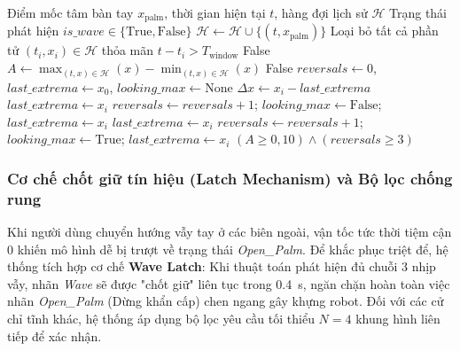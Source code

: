 \begin{algorithm}[H]
\caption{Thuật toán phát hiện cử chỉ động Wave}\label{alg:wave_detection}
\begin{algorithmic}[1]
\Require Điểm mốc tâm bàn tay $x_{\text{palm}}$, thời gian hiện tại $t$, hàng đợi lịch sử $\mathcal{H}$
\Ensure Trạng thái phát hiện $is\_wave \in \{\text{True}, \text{False}\}$
\State $\mathcal{H} \gets \mathcal{H} \cup \{(t, x_{\text{palm}})\}$
\State Loại bỏ tất cả phần tử $(t_i, x_i) \in \mathcal{H}$ thỏa mãn $t - t_i > T_{\text{window}}$
    \State \Return False
\EndIf
\State $A \gets \max_{(t, x) \in \mathcal{H}}(x) - \min_{(t, x) \in \mathcal{H}}(x)$ 
    \State \Return False 
\EndIf
\State $reversals \gets 0$, $last\_extrema \gets x_0$, $looking\_max \gets \text{None}$
    \State $\Delta x \gets x_i - last\_extrema$
         $last\_extrema \gets x_i$
         
            $reversals \gets reversals + 1$; $looking\_max \gets \text{False}$; $last\_extrema \gets x_i$
        \EndIf
    \Else
         $last\_extrema \gets x_i$
         
            $reversals \gets reversals + 1$; $looking\_max \gets \text{True}$; $last\_extrema \gets x_i$
        \EndIf
    \EndIf
\EndFor
\State \Return $(A \ge 0{,}10) \land (reversals \ge 3)$ 
\end{algorithmic}
\end{algorithm}

\subsubsection{Cơ chế chốt giữ tín hiệu (Latch Mechanism) và Bộ lọc chống rung}
Khi người dùng chuyển hướng vẫy tay ở các biên ngoài, vận tốc tức thời tiệm cận 0 khiến mô hình dễ bị trượt về trạng thái \textit{Open\_Palm}. Để khắc phục triệt để, hệ thống tích hợp cơ chế \textbf{Wave Latch}: Khi thuật toán phát hiện đủ chuỗi 3 nhịp vẫy, nhãn \textit{Wave} sẽ được "chốt giữ" liên tục trong \SI{0.4}{\second}, ngăn chặn hoàn toàn việc nhãn \textit{Open\_Palm} (Dừng khẩn cấp) chen ngang gây khựng robot. Đối với các cử chỉ tĩnh khác, hệ thống áp dụng bộ lọc yêu cầu tối thiểu $N=4$ khung hình liên tiếp để xác nhận.

